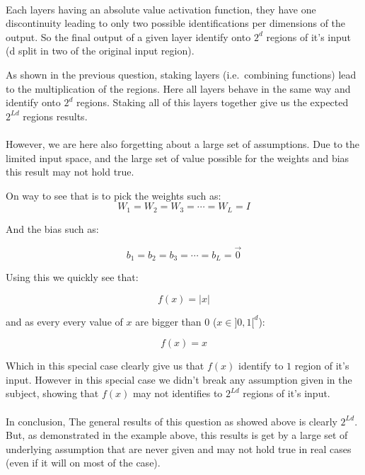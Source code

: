 \paragraph{}
Each layers having an absolute value activation function, they have one discontinuity leading to only two possible 
identifications per dimensions of the output.
So the final output of a given layer identify onto $2^d$ regions of it's input (d split in two of the original input 
region).

As shown in the previous question, staking layers (i.e.\ combining functions) lead to the multiplication of the regions.
Here all layers behave in the same way and identify onto $2^d$ regions.
Staking all of this layers together give us the expected $2^{Ld}$ regions results.

\paragraph{}
However, we are here also forgetting about a large set of assumptions.
Due to the limited input space, and the large set of value possible for the weights and bias this result may not hold 
true.

On way to see that is to pick the weights such as:
\[
    W_1 = W_2 = W_3 = \cdots = W_L = I
\]

And the bias such as:

\[
    b_1 = b_2 = b_3 = \cdots = b_L = \vec{0}
\]

Using this we quickly see that:

\[
    f(x) = | x |
\]

and as every every value of $x$ are bigger than $0$ ($x \in ]0,1[^d$):

\[
    f(x) = x
\]

Which in this special case clearly give us that $f(x)$ identify to $1$ region of it's input.
However in this special case we didn't break any assumption given in the subject, showing that $f(x)$ may not identifies
to $2^{Ld}$ regions of it's input.

\paragraph{}
In conclusion, The general results of this question as showed above is clearly $2^{Ld}$.
But, as demonstrated in the example above, this results is get by a large set of underlying assumption that are never
given and may not hold true in real cases (even if it will on most of the case).


